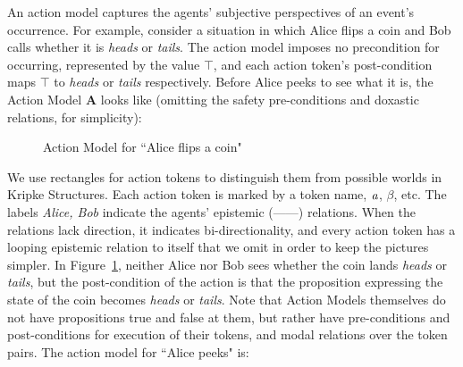 An action model captures the agents' subjective perspectives of an event's occurrence. For example, consider a situation in which Alice flips a coin and Bob calls whether it is \emph{heads} or \emph{tails}. The action model imposes no precondition for occurring, represented by the value $\top$, and each action token's post-condition maps $\top$ to \emph{heads} or \emph{tails} respectively. Before Alice peeks to see what it is, the Action Model $\mathbf{A}$ looks like (omitting the safety pre-conditions and doxastic relations, for simplicity):
\begin{figure}[H]
\begin{center}
\end{center}
\caption{Action Model for ``Alice flips a coin"}
\label{fig: flip}
\end{figure}
We use rectangles for action tokens to distinguish them from possible worlds in Kripke Structures. Each action token is marked by a token name, $\mathit{a}$, $\beta$, etc. The labels \emph{Alice, Bob} indicate the agents' epistemic (------) relations. When the relations lack direction, it indicates bi-directionality, and every action token has a looping epistemic relation to itself that we omit in order to keep the pictures simpler. In Figure~\ref{fig: flip}, neither Alice nor Bob sees whether the coin lands \emph{heads} or \emph{tails}, but the post-condition of the action is that the proposition expressing the state of the coin becomes \emph{heads} or \emph{tails}. Note that Action Models themselves do not have propositions true and false at them, but rather have pre-conditions and post-conditions for execution of their tokens, and modal relations over the token pairs. The action model for ``Alice peeks" is:

